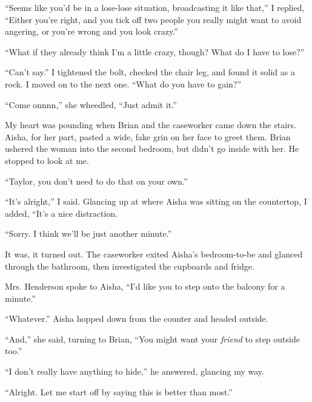 ``Seems like you'd be in a lose-lose situation, broadcasting it like that,'' I replied, ``Either you're right, and you tick off two people you really might want to avoid angering, or you're wrong and you look crazy.''



``What if they already think I'm a little crazy, though?  What do I have to lose?''



``Can't say.''  I tightened the bolt, checked the chair leg, and found it solid as a rock.  I moved on to the next one.  ``What do you have to gain?''



``Come onnnn,'' she wheedled, ``Just admit it.''



My heart was pounding when Brian and the caseworker came down the stairs.  Aisha, for her part, pasted a wide, fake grin on her face to greet them.  Brian ushered the woman into the second bedroom, but didn't go inside with her.  He stopped to look at me.



``Taylor, you don't need to do that on your own.''



``It's alright,'' I said.  Glancing up at where Aisha was sitting on the countertop, I added, ``It's a nice distraction.



``Sorry.  I think we'll be just another minute.''



It was, it turned out.  The caseworker exited Aisha's bedroom-to-be and glanced through the bathroom, then investigated the cupboards and fridge.



Mrs. Henderson spoke to Aisha, ``I'd like you to step onto the balcony for a minute.''



``Whatever.''  Aisha hopped down from the counter and headed outside.



``And,'' she said, turning to Brian, ``You might want your \emph{friend} to step outside too.''



``I don't really have anything to hide,'' he answered, glancing my way.



``Alright.  Let me start off by saying this is better than most.''



